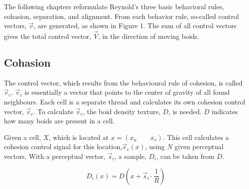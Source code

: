 \documentclass[a4paper, 10pt, journal]{wissarbIEEE}      %
\begin{document}
The following chapters reformulate Reynold's three basic behavioral rules, cohasion, separation, and alignment. From each behavior rule, so-called control vectors, $\vec{v}$, are generated, as shown in Figure 1. The sum of all control vectors gives the total control vector, $\vec{V}$, in the direction of moving boids.



\subsection{Cohasion}


The control vector, which results from the behavioural rule of cohesion, is called $\vec{v}_c$. $\vec{v}_c$ is essentially a vector that points to the center of gravity of all found neighbours. Each cell is a separate thread and calculates its own cohesion control vector,  $\vec{v}_c$. To calculate  $\vec{v}_c$, the boid density texture, $D$, is needed. $D$ indicates how many boids are present in a cell. 





Given a cell, $X$, which is located at $x = (x_u \qquad x_v)$. This cell calculates a cohesion control signal for this location,$\vec{v}_c(x)$, using $N$ given perceptual vectors. With a perceptual vector, $\vec{s}_i$, a sample, $D_i$, can be taken from $D$.

\begin{equation}
D_i(x) = D(x + \vec{s}_i \cdot \frac{1}{R})
\label{Form_Di}
\end{equation}

\end{document}
